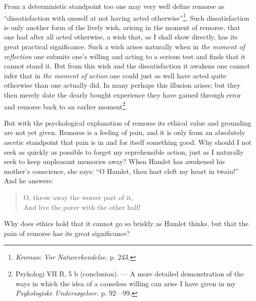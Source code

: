 \documentclass[12pt,a4paper,openany]{book}
\newcommand{\opage}[1]{\marginnote{\footnotesize\textit{[#1]}}}
\begin{document}
From a deterministic standpoint too one may very well define remorse as ``dissatisfaction with oneself at
not having acted otherwise''\footnote[1]{\emph{Kroman}: \textit{Vor Naturerkendelse.} p. 243.}. Such
dissatisfaction is only another form of the lively wish, arising in the moment of remorse, that one had
after all acted otherwise, a wish that, as I shall show directly, has its great practical significance.
Such a wish arises naturally when in \textit{the moment of reflection} one submits one's willing and acting
to a serious test and finds that it cannot stand it. But from this wish and the dissatisfaction it
awakens one cannot infer that in \textit{the moment of action} one could just as well have acted quite
otherwise than one actually did. In many perhaps this illusion arises; but they then merely date the
dearly bought experience they have gained through error and remorse back to an earlier
moment\footnote[2]{Psykologi VII B, 5 b (conclusion). --- A more detailed demonstration of the ways in
which the idea of a causeless willing can arise I have given in my \textit{Psykologiske Undersøgelser.} p.
92---99.}.

\opage{119}But with the psychological explanation of remorse its ethical value and grounding are not yet given.
Remorse is a feeling of pain, and it is only from an absolutely ascetic standpoint that pain is in and for
itself something good. Why should I not seek as quickly as possible to forget my reprehensible action,
just as I naturally seek to keep unpleasant memories away? When Hamlet has awakened his mother's
conscience, she says: ``O Hamlet, thou hast cleft my heart in twain!'' And he answers:

\begin{quote}
O, throw away the worser part of it,\\
And live the purer with the other half!
\end{quote}

Why does ethics hold that it cannot go so briskly as Hamlet thinks, but that the pain of remorse has its
great significance?
\end{document}
